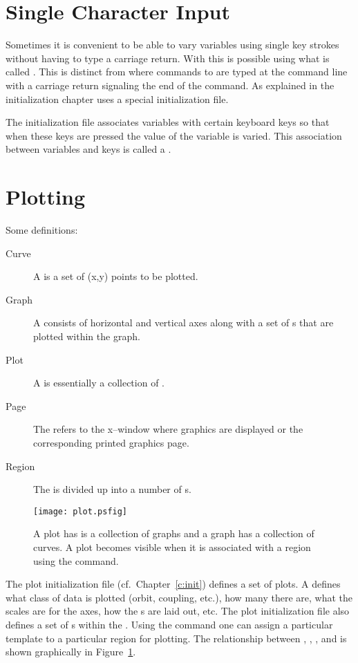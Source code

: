 \section{Single Character Input}

Sometimes it is convenient to be able to vary variables using single key strokes
without having to type a carriage return.
With \tao this is possible using what is called . This is distinct from
 where commands to \tao are typed at the command line with a carriage 
return signaling the end of the command. As explained in the initialization chapter
 uses a special initialization file.

The  initialization file associates variables with certain keyboard keys
so that when these keys are pressed the value of the variable is varied. This association
between variables and keys is called a .

\section{Plotting}

Some definitions:
\begin{description}
\item[Curve]
A  is a set of (x,y) points to be plotted.
\item[Graph]
A  consists of horizontal and vertical axes along with a set
of s that are plotted within the graph. 
\item[Plot]
A  is essentially a collection of .
\item[Page]
The  refers to the x--window where graphics are displayed or the 
corresponding printed graphics page.
\item[Region]
The  is divided up into a number of s. 
\end{description}

\begin{figure}
  \centering
  \texttt{[image: plot.psfig]}
  \caption{A plot has is a collection of graphs and a graph has a 
collection of curves. A plot becomes visible when it 
is associated with a region using the  command.}
  \label{f:plot}
\end{figure}

The plot initialization file (cf.~Chapter~\ref{c:init}) defines a set
of  plots. A  defines what class of data is
plotted (orbit, coupling, etc.), how many  there are, what
the scales are for the  axes, how the s are laid
out, etc.  The plot initialization file also defines a set of
s within the .  Using the  command one
can assign a particular template to a particular region for plotting.
The relationship between , , , and
 is shown graphically in Figure~\ref{f:plot}.


